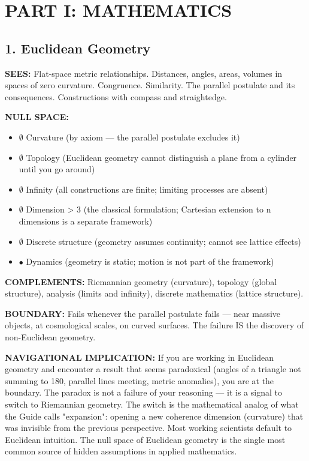 \section*{PART I: MATHEMATICS}


\subsection*{1. Euclidean Geometry}


\textbf{SEES:} Flat-space metric relationships. Distances, angles, areas, volumes in spaces of zero curvature. Congruence. Similarity. The parallel postulate and its consequences. Constructions with compass and straightedge.


\textbf{NULL SPACE:}

\begin{itemize}[nosep,leftmargin=*]
  \item $\emptyset$ Curvature (by axiom — the parallel postulate excludes it)
  \item $\emptyset$ Topology (Euclidean geometry cannot distinguish a plane from a cylinder until you go around)
  \item $\emptyset$ Infinity (all constructions are finite; limiting processes are absent)
  \item $\emptyset$ Dimension > 3 (the classical formulation; Cartesian extension to n dimensions is a separate framework)
  \item $\emptyset$ Discrete structure (geometry assumes continuity; cannot see lattice effects)
  \item $\bullet$ Dynamics (geometry is static; motion is not part of the framework)
\end{itemize}


\textbf{COMPLEMENTS:} Riemannian geometry (curvature), topology (global structure), analysis (limits and infinity), discrete mathematics (lattice structure).


\textbf{BOUNDARY:} Fails whenever the parallel postulate fails — near massive objects, at cosmological scales, on curved surfaces. The failure IS the discovery of non-Euclidean geometry.


\textbf{NAVIGATIONAL IMPLICATION:} If you are working in Euclidean geometry and encounter a result that seems paradoxical (angles of a triangle not summing to 180, parallel lines meeting, metric anomalies), you are at the boundary. The paradox is not a failure of your reasoning — it is a signal to switch to Riemannian geometry. The switch is the mathematical analog of what the Guide calls "expansion": opening a new coherence dimension (curvature) that was invisible from the previous perspective. Most working scientists default to Euclidean intuition. The null space of Euclidean geometry is the single most common source of hidden assumptions in applied mathematics.


